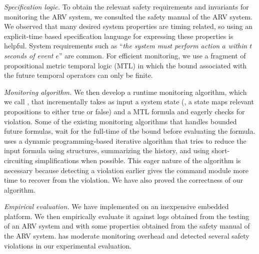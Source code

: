 \emph{Specification logic. }
To obtain the relevant safety requirements and invariants for monitoring the ARV system, we consulted the safety 
manual of the ARV system. We observed that many desired system properties are timing related, so using an explicit-time 
based specification language for expressing these properties is helpful. System requirements such as ``\emph{the system must 
perform action $a$ within $t$ seconds of event $e$}'' are common. For efficient monitoring, we use a fragment of propositional 
metric temporal logic (MTL)\cite{MTL} in which the bound associated with the future temporal operators can only be finite. 

\emph{Monitoring algorithm. }
We then develop a runtime monitoring algorithm, which we call \monitor, that incrementally takes as input a system state (\ie, a 
state maps relevant propositions to either true or false) and a MTL formula and eagerly checks for violation. Some of the existing 
monitoring algorithms that handles bounded future formulas, wait for the full-time of the bound before evaluating the formula. 
\monitor uses a dynamic programming-based iterative algorithm that tries to reduce the input formula using  structures, summarizing the history, 
and using short-circuiting simplifications when possible. This eager nature of the algorithm is necessary because detecting a violation earlier 
gives the command module more time to recover from the violation. We have also proved the correctness of our algorithm. 

\emph{Empirical evaluation. } 
We have  implemented \monitor on an inexpensive embedded platform. We then empirically evaluate it against logs obtained from 
the testing of an ARV system and with some properties obtained from the safety manual of the ARV system. \monitor has moderate  
monitoring overhead and detected several safety violations in our experimental evaluation.  





